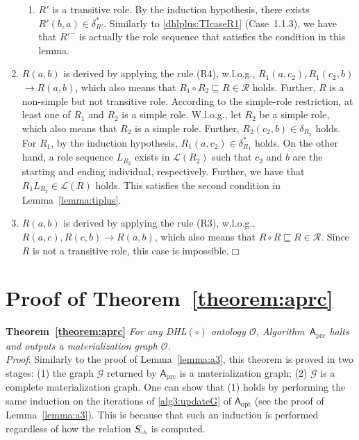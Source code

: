 \begin{enumerate}[leftmargin=12ex,label=Case~3.\arabic*, ref=Case~3.\arabic*]
\begin{enumerate}[leftmargin=8ex,label=Case~3.2.\arabic*]
     \item $R'$ is a transitive role.
        By the induction hypothesis, there exists $R'(b,a)\in\delta^*_{R'}$.
        Similarly to \ref{dhlplus:TIcaseR1} (Case~1.1.3), we have that
        $R'^-$ is actually the role sequence that satisfies the condition
        in this lemma.
    \end{enumerate}

\item $R(a,b)$ is derived by applying the rule (R4), w.l.o.g.,
    $R_1(a,c_2),R_1(c_2,b)$ $\rightarrow R(a,b)$,
    which also means that $R_1\circ R_2\sqsubseteq R\in\mathcal{R}$ holds.
    Further, $R$ is a non-simple but not transitive role. According to the simple-role restriction,
    at least one of $R_1$ and $R_2$ is a simple role.
    W.l.o.g., let $R_2$ be a simple role, which also
    means that $R_2$ is a simple role. Further, $R_2(c_2,b)\in\delta_{R_2}$ holds.
    For $R_1$, by the induction hypothesis, $R_1(a,c_2)\in\delta^*_{R_1}$ holds.
    On the other hand, a role sequence $L_{R_2}$ exists in $\mathcal{L}(R_2)$ such that $c_2$ and $b$
    are the starting and ending individual, respectively.
    Further, we have that $R_1L_{R_2}\in\mathcal{L}(R)$ holds. This satisfies the second condition
    in Lemma~\ref{lemma:tiplus}.\label{dhlplus:TIcaseR4}

\item $R(a,b)$ is derived by applying the rule (R3), w.l.o.g., $R(a,c),R(c,b)\rightarrow R(a,b)$,
    which also means that $R\circ R\sqsubseteq R\in\mathcal{R}$.
    Since $R$ is not a transitive role, this case is impossible.\hfill$\Box$
\end{enumerate}

\section{Proof of Theorem~\ref{theorem:aprc}}

\textbf{Theorem~\ref{theorem:aprc}}
\emph{For any DHL$(\circ)$ ontology $\mathcal{O}$, Algorithm~$\mathsf{A}_{\text{prc}}$ halts and outputs
a materialization graph $\mathcal{O}$.}\\

\noindent\emph{Proof}: Similarly to the proof of Lemma~\ref{lemma:a3},
this theorem is proved in two stages:
(1) the graph $\mathcal{G}$ returned by $\mathsf{A}_{\text{prc}}$ is a materialization graph;
(2) $\mathcal{G}$ is a complete materialization graph.
One can show that (1) holds by performing the same induction on the iterations of \ref{alg3:updateG} of $\mathsf{A}_{\text{opt}}$
(see the proof of Lemma~\ref{lemma:a3}). This is because that
such an induction is performed regardless of how the relation $S_{\textit{\!\tiny rch}}$ is computed.

